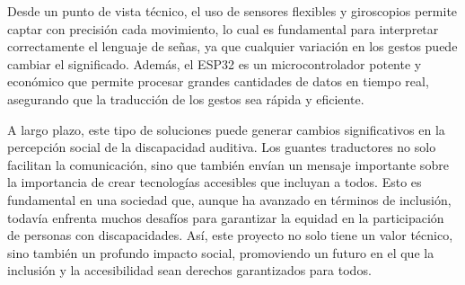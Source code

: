 Desde un punto de vista técnico, el uso de sensores flexibles y giroscopios permite captar con precisión cada movimiento, lo cual es fundamental para interpretar correctamente el lenguaje de señas, ya que cualquier variación en los gestos puede cambiar el significado. Además, el ESP32 es un microcontrolador potente y económico que permite procesar grandes cantidades de datos en tiempo real, asegurando que la traducción de los gestos sea rápida y eficiente.

A largo plazo, este tipo de soluciones puede generar cambios significativos en la percepción social de la discapacidad auditiva. Los guantes traductores no solo facilitan la comunicación, sino que también envían un mensaje importante sobre la importancia de crear tecnologías accesibles que incluyan a todos. Esto es fundamental en una sociedad que, aunque ha avanzado en términos de inclusión, todavía enfrenta muchos desafíos para garantizar la equidad en la participación de personas con discapacidades. Así, este proyecto no solo tiene un valor técnico, sino también un profundo impacto social, promoviendo un futuro en el que la inclusión y la accesibilidad sean derechos garantizados para todos.